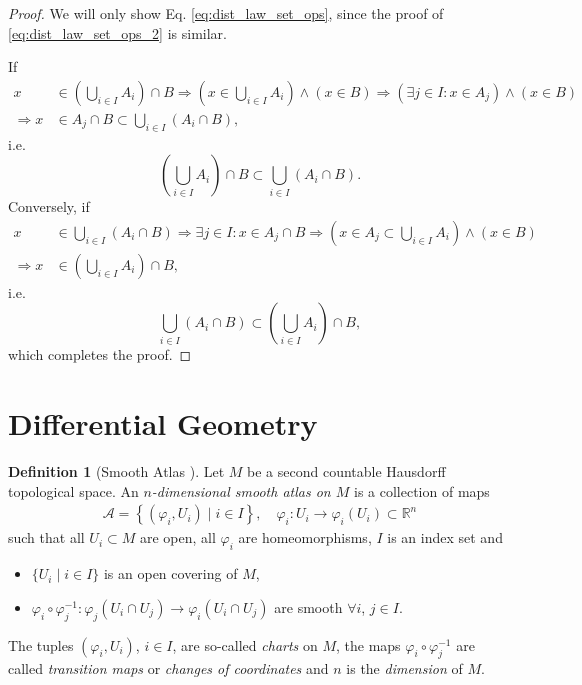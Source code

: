 \documentclass[12pt, a4paper]{article}
\numberwithin{equation}{section}
\theoremstyle{definition}
\theoremstyle{definition}
\newtheorem{defn}[thm]{Definition} %
\begin{document}
	\begin{proof}
		We will only show Eq. \eqref{eq:dist_law_set_ops}, since the proof of \eqref{eq:dist_law_set_ops_2} is similar.
		
		If 
		\begin{align*}
			x&\in \left(\bigcup_{i\in I} A_i\right) \cap B \Rightarrow \left(x\in \bigcup_{i\in I}A_i\right) \wedge \left(x\in B\right)\Rightarrow (\exists j\in I: x\in A_j) \wedge (x\in B)
			\\ \Rightarrow x&\in A_j\cap B \subset \bigcup_{i\in I}(A_i \cap B),
		\end{align*}
		i.e. $$\left(\bigcup_{i\in I} A_i\right) \cap B \subset \bigcup_{i\in I}(A_i \cap B).$$
		Conversely, if 
		\begin{align*}
			x&\in \bigcup_{i\in I}(A_i \cap B) \Rightarrow \exists j\in I: x\in A_j \cap B\Rightarrow \left(x\in A_j\subset \bigcup_{i\in I}A_i\right) \wedge \left(x\in B\right)
			\\ \Rightarrow x &\in \left(\bigcup_{i\in I}A_i\right) \cap B,
		\end{align*}
		i.e. 
		$$\bigcup_{i\in I}(A_i \cap B) \subset \left(\bigcup_{i\in I} A_i\right) \cap B,$$
		which completes the proof.
	\end{proof}
	
	\newpage 
	\section{Differential Geometry}
	\begin{samepage}
		\begin{defn}[Smooth Atlas \cite{Lindemann-lec1}]
			Let $M$ be a second countable Hausdorff topological space. An \textit{$n$-dimensional smooth atlas on $M$}  is a collection of maps
			\begin{align*}
				\mathcal A = \left\{\left(\varphi_i, U_i\right)\mid i\in I\right\}, \quad \varphi_i: U_i \rightarrow \varphi_i(U_i) \subset \mathbb R^n
			\end{align*}
			such that all $U_i \subset M$ are open, all $\varphi_i$ are homeomorphisms, $I$ is an index set and 
			\begin{itemize}
				\item $\{U_i \mid i\in I\}$ is an open covering of $M$, 
				\item $\varphi_i \circ \varphi_j^{-1}: \varphi_j(U_i \cap U_j) \rightarrow \varphi_i(U_i \cap U_j)$ are smooth $\forall i$, $j \in I$. 
			\end{itemize}
			The tuples $(\varphi_i, U_i)$, $i\in I$, are so-called \textit{charts} on $M$, the maps $\varphi_i\circ \varphi_j^{-1}$ are called \textit{transition maps} or \textit{changes of coordinates} and $n$ is the \textit{dimension} of $M$.
		\end{defn}
	\end{samepage}
\end{document}
